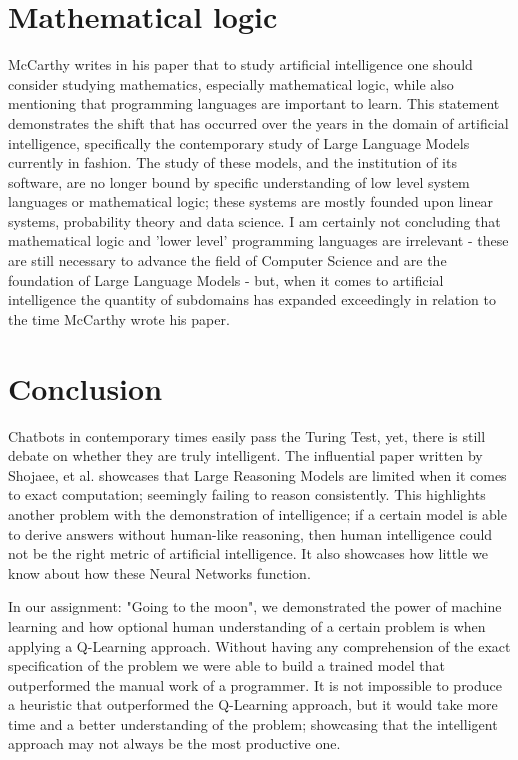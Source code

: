 \documentclass[10pt]{diazessay} %
\begin{document}
\section*{Mathematical logic}
McCarthy writes in his paper that to study artificial intelligence one should consider studying mathematics, especially mathematical logic\cite{mcarthy}, while also mentioning that programming languages are important to learn. This statement demonstrates the shift that has occurred over the years in the domain of artificial intelligence, specifically the contemporary study of Large Language Models currently in fashion. The study of these models, and the institution of its software, are no longer bound by specific understanding of low level system languages or mathematical logic; these systems are mostly founded upon linear systems, probability theory and data science. I am certainly not concluding that  mathematical logic and 'lower level' programming languages are irrelevant - these are still necessary to advance the field of Computer Science and are the foundation of Large Language Models - but, when it comes to artificial intelligence the quantity of subdomains has expanded exceedingly in relation to the time McCarthy wrote his paper.




\section*{Conclusion}
Chatbots in contemporary times easily pass the Turing Test, yet, there is still debate on whether they are truly intelligent. The influential paper written by Shojaee, et al. showcases that Large Reasoning Models are limited when it comes to exact computation; seemingly failing to reason consistently\cite{shoj}. This highlights another problem with the demonstration of intelligence; if a certain model is able to derive answers without human-like reasoning, then human intelligence could not be the right metric of artificial intelligence. It also showcases how little we know about how these Neural Networks function.


In our assignment: "Going to the moon", we demonstrated the power of machine learning and how optional human understanding of a certain problem is when applying a Q-Learning approach. Without having any comprehension of the exact specification of the problem we were able to build a trained model that outperformed the manual work of a programmer. It is not impossible to produce a heuristic that outperformed the Q-Learning approach, but it would  take more time and a better understanding of the problem; showcasing that the intelligent approach may not always be the most productive one.







\end{document}
